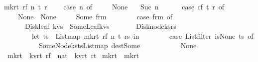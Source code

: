 \begin{isabellebody}
{\isachardoublequoteopen}mk{\isacharunderscore}r{}t{\isacharprime}\ r{}f\ n\ t\ r\ {\isacharequal}\ {\isacharparenleft}\isanewline
\ \ case\ n\ of\ \isanewline
\ \ {}\ {\isasymRightarrow}\ None\isanewline
\ \ {\isacharbar}\ Suc\ n\ {\isasymRightarrow}\ {\isacharparenleft}\isanewline
\ \ \ \ case\ r{}f\ t\ r\ of\isanewline
\ \ \ \ None\ {\isasymRightarrow}\ None\isanewline
\ \ \ \ {\isacharbar}\ Some\ frm\ {\isasymRightarrow}\ {\isacharparenleft}\isanewline
\ \ \ \ \ \ case\ frm\ of\isanewline
\ \ \ \ \ \ Disk{\isacharunderscore}leaf\ kvs\ {\isasymRightarrow}\ Some{\isacharparenleft}Leaf{\isacharparenleft}kvs{\isacharparenright}{\isacharparenright}\isanewline
\ \ \ \ \ \ {\isacharbar}\ Disk{\isacharunderscore}node{\isacharparenleft}ks{\isacharcomma}rs{\isacharparenright}\ {\isasymRightarrow}\ {\isacharparenleft}\isanewline
\ \ \ \ \ \ \ \ let\ ts\ {\isacharequal}\ List{\isachardot}map\ {\isacharparenleft}mk{\isacharunderscore}r{}t{\isacharprime}\ r{}f\ n\ t{\isacharparenright}\ rs\ in\isanewline
\ \ \ \ \ \ \ \ case\ {\isacharparenleft}List{\isachardot}filter\ is{\isacharunderscore}None\ ts{\isacharparenright}\ of\isanewline
\ \ \ \ \ \ \ \ {\isacharbrackleft}{\isacharbrackright}\ {\isasymRightarrow}\ Some{\isacharparenleft}Node{\isacharparenleft}ks{\isacharcomma}ts{\isacharbar}{\isachargreater}List{\isachardot}map\ dest{\isacharunderscore}Some{\isacharparenright}{\isacharparenright}\isanewline
\ \ \ \ \ \ \ \ {\isacharbar}\ {\isacharunderscore}\ {\isasymRightarrow}\ None\ {\isacharparenright}{\isacharparenright}{\isacharparenright}{\isacharparenright}{\isachardoublequoteclose}\isanewline
\isanewline
\isanewline
{}\isamarkupfalse%
\ mk{\isacharunderscore}r{}t\ {\isacharcolon}{\isacharcolon}\ {\isachardoublequoteopen}{\isacharparenleft}{\isacharprime}k{\isacharcomma}{\isacharprime}v{\isacharcomma}{\isacharprime}r{\isacharcomma}{\isacharprime}t{\isacharparenright}\ r{}f\ {\isasymRightarrow}\ nat\ {\isasymRightarrow}\ {\isacharparenleft}{\isacharprime}k{\isacharcomma}{\isacharprime}v{\isacharcomma}{\isacharprime}r{\isacharcomma}{\isacharprime}t{\isacharparenright}\ r{}t{\isachardoublequoteclose}\ \isanewline
{\isachardoublequoteopen}mk{\isacharunderscore}r{}t\ {\isacharequal}\ mk{\isacharunderscore}r{}t{\isacharprime}{\isachardoublequoteclose}\isanewline
\isanewline
\isanewline
\isanewline
%
\isadelimtheory
\isanewline
%
\endisadelimtheory
%
\isatagtheory
{}\isamarkupfalse%
%
\endisatagtheory
{\isafoldtheory}%
%
\isadelimtheory
%
\endisadelimtheory
\end{isabellebody}%
